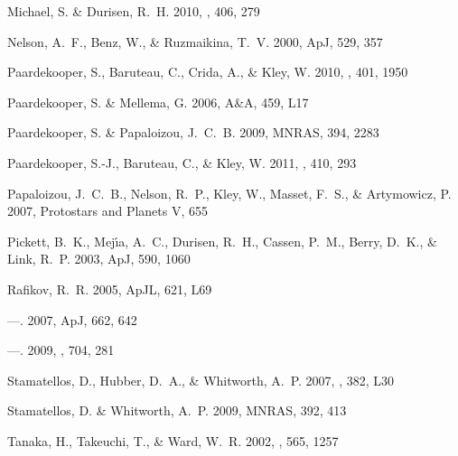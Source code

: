 \documentclass[12pt,manuscript,authoryear]{aastex}
\begin{document}
\begin{thebibliography}{48}
{Michael}, S. \& {Durisen}, R.~H. 2010, \mnras, 406, 279

{Nelson}, A.~F., {Benz}, W., \& {Ruzmaikina}, T.~V. 2000, ApJ, 529, 357

{Paardekooper}, S., {Baruteau}, C., {Crida}, A., \& {Kley}, W. 2010, \mnras,
  401, 1950

{Paardekooper}, S. \& {Mellema}, G. 2006, A\&A, 459, L17

{Paardekooper}, S. \& {Papaloizou}, J.~C.~B. 2009, MNRAS, 394, 2283

{Paardekooper}, S.-J., {Baruteau}, C., \& {Kley}, W. 2011, \mnras, 410, 293

{Papaloizou}, J.~C.~B., {Nelson}, R.~P., {Kley}, W., {Masset}, F.~S., \&
  {Artymowicz}, P. 2007, Protostars and Planets V, 655

{Pickett}, B.~K., {Mej{\'{\i}}a}, A.~C., {Durisen}, R.~H., {Cassen}, P.~M.,
  {Berry}, D.~K., \& {Link}, R.~P. 2003, ApJ, 590, 1060

{Rafikov}, R.~R. 2005, ApJL, 621, L69

---. 2007, ApJ, 662, 642

---. 2009, \apj, 704, 281

{Stamatellos}, D., {Hubber}, D.~A., \& {Whitworth}, A.~P. 2007, \mnras, 382,
  L30

{Stamatellos}, D. \& {Whitworth}, A.~P. 2009, MNRAS, 392, 413

{Tanaka}, H., {Takeuchi}, T., \& {Ward}, W.~R. 2002, \apj, 565, 1257


\end{thebibliography}
\end{document}
